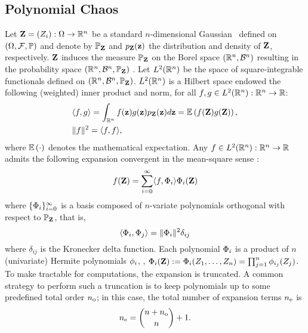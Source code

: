 \subsection{Polynomial Chaos}
Let $\vZ = (\Z_i): \outcomes \to \real^n$ be a standard $n$-dimensional Gaussian \rv\ defined on $\probabilitySpace$ and denote by $\gaussianProbabilityMeasure$ and $\f{\vZ}{\vz}$ the distribution and density of $\vZ$, respectively. $\vZ$ induces the measure $\gaussianProbabilityMeasure$ on the Borel space $\borelSpace[n]$ resulting in the probability space $\gaussianProbabilitySpace[n]$ \cite{durrett2010}. Let $\L{2}(\real^n)$ be the space of square-integrable functionals defined on $\gaussianProbabilitySpace[n]$. $\L{2}(\real^n)$ is a Hilbert space endowed the following (weighted) inner product and norm, for all $f, g \in \L{2}(\real^n): \real^n \to \real$:
\begin{align}
  & \iprod{f, g} = \int_{\real^n} f(\vz) g(\vz) \f{\vZ}{\vz} \d\vz = \E{f(\vZ) g(\vZ)}, \elabel{inner-product} \\
  & \norm{f}^2 = \iprod{f, f} \nonumber,
\end{align}
where $\E{\cdot}$ denotes the mathematical expectation. Any $f \in \L{2}(\real^n): \real^n \to \real$ admits the following expansion convergent in the mean-square sense \cite{maitre2010}:
\begin{equation} \elabel{pc-expansion}
  f(\vZ) = \sum_{i = 0}^\infty \iprod{f, \vpcb_i} \vpcb_i(\vZ)
\end{equation}
where $\{ \vpcb_i \}_{i = 0}^\infty$ is a basis composed of $n$-variate polynomials orthogonal with respect to $\gaussianProbabilityMeasure$, that is,
\[
  \iprod{\vpcb_i, \vpcb_j} = \norm{\vpcb_i}^2 \delta_{ij}
\]
where $\delta_{ij}$ is the Kronecker delta function. Each polynomial $\vpcb_i$ is a product of $n$ (univariate) Hermite polynomials $\pcb_i$, \ie, $\vpcb_i(\vZ) := \vpcb_i(\Z_1, \dotsc, \Z_n) = \prod_{j = 1}^n \pcb_{i_j}(\Z_j)$. To make  tractable for computations, the expansion is truncated. A common strategy to perform such a truncation is to keep polynomials up to some predefined total order $\norder$; in this case, the total number of expansion terms $\nterms$ is
\[
  \nterms = {n + \norder \choose n} + 1.
\]

